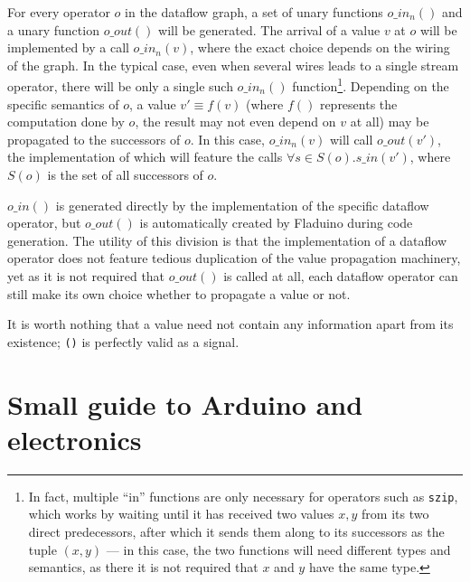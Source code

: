 \documentclass[a4paper, oneside, draft]{memoir}
\begin{document}
For every operator $o$ in the dataflow graph, a set of unary
functions $o\_in_n()$ and a unary function $o\_out()$ will be
generated.  The arrival of a value $v$ at $o$ will be implemented by a
call $o\_in_n(v)$, where the exact choice depends on the wiring of the
graph.  In the typical case, even when several wires leads to a single
stream operator, there will be only a single such $o\_in_n()$
function\footnote{In fact, multiple ``in'' functions are only
  necessary for operators such as \texttt{szip}, which works by
  waiting until it has received two values $x, y$ from its two direct
  predecessors, after which it sends them along to its successors as
  the tuple $(x,y)$ --- in this case, the two functions will need
  different types and semantics, as there it is not required that $x$
  and $y$ have the same type.}.  Depending on the specific semantics
of $o$, a value $v'\equiv f(v)$ (where $f()$ represents the
computation done by $o$, the result may not even depend on $v$ at all)
may be propagated to the successors of $o$.  In this case,
$o\_in_n(v)$ will call $o\_out(v')$, the implementation of which will
feature the calls $\forall s \in S(o). s\_in(v')$, where $S(o)$ is the
set of all successors of $o$.

$o\_in()$ is generated directly by the implementation of the specific
dataflow operator, but $o\_out()$ is automatically created by Fladuino
during code generation.  The utility of this division is that the
implementation of a dataflow operator does not feature tedious
duplication of the value propagation machinery, yet as it is not
required that $o\_out()$ is called at all, each dataflow operator can
still make its own choice whether to propagate a value or not.

It is worth nothing that a value need not contain any information
apart from its existence; \texttt{()} is perfectly valid as a signal.





\appendix

\chapter{Small guide to Arduino and electronics}

\end{document}
